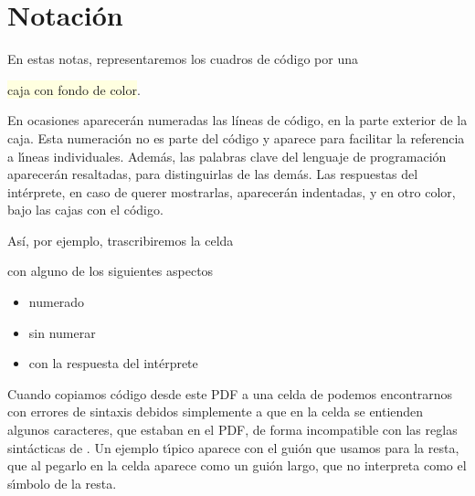 \section{Notación}

En estas notas, representaremos los cuadros de código por una
\begin{center}
\colorbox{LightYellow}{caja con fondo de color}.
\end{center}
 En ocasiones aparecerán
numeradas las líneas de código,  en la parte exterior de la caja. Esta
numeración no es parte del código y aparece para facilitar la referencia a l\'{\i}neas individuales.
Además, las palabras clave del lenguaje de programación aparecerán resaltadas, 
para distinguirlas de las demás. Las respuestas del intérprete, 
en caso de querer mostrarlas, aparecerán indentadas, y en otro color, bajo las
cajas 
con el código.

Así, por ejemplo, trascribiremos la celda

\noindent con alguno de los siguientes aspectos
\footnotesize
\begin{itemize}
 \item numerado
\item sin numerar
\item con la respuesta del intérprete
\end{itemize}
\normalsize
Cuando copiamos c\'odigo desde este PDF a una celda de {\sage} podemos encontrarnos con errores de sintaxis debidos simplemente a que en la celda se entienden algunos caracteres,  que estaban en el PDF,  de forma incompatible con las reglas sint\'acticas de {\sage}. Un ejemplo t\'{\i}pico aparece con el gui\'on que usamos para la resta, que al pegarlo en la celda aparece como un gui\'on largo, que {\sage} no interpreta como el s\'{\i}mbolo de la resta. 

